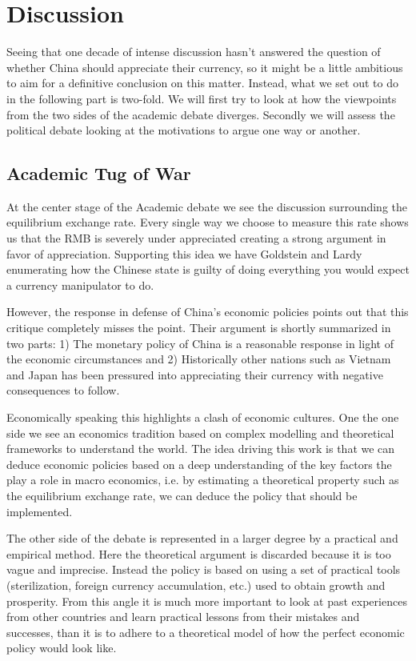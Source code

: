 \section{Discussion}
\label{sec:discussion}


Seeing that one decade of intense discussion hasn't answered the 
question of whether China should appreciate their currency, so it might 
be a little ambitious to aim for a definitive conclusion on this matter.  
Instead, what we set out to do in the following part is two-fold. We 
will first try to look at how the viewpoints from the two sides of the 
academic debate diverges. Secondly we will assess the political debate 
looking at the motivations to argue one way or another.

\subsection{Academic Tug of War}

At the center stage of the Academic debate we see the discussion 
surrounding the equilibrium exchange rate. Every single way we choose to 
measure this rate shows us that the RMB is severely under appreciated 
creating a strong argument in favor of appreciation. Supporting this 
idea we have Goldstein and Lardy enumerating how the Chinese state is 
guilty of doing everything you would expect a currency manipulator to 
do.

However, the response in defense of China's economic policies points out 
that this critique completely misses the point. Their argument is 
shortly summarized in two parts: 1) The monetary policy of China is a 
reasonable response in light of the economic circumstances and 2) 
Historically other nations such as Vietnam and Japan has been pressured 
into appreciating their currency with negative consequences to follow.

Economically speaking this highlights a clash of economic cultures. One 
the one side we see an economics tradition based on complex modelling 
and theoretical frameworks to understand the world. The idea driving 
this work is that we can deduce economic policies based on a deep 
understanding of the key factors the play a role in macro economics, 
i.e. by estimating a theoretical property such as the equilibrium 
exchange rate, we can deduce the policy that should be implemented.  

The other side of the debate is represented in a larger degree by a 
practical and empirical method. Here the theoretical argument is 
discarded because it is too vague and imprecise. Instead the policy is 
based on using a set of practical tools (sterilization, foreign currency 
accumulation, etc.) used to obtain growth and prosperity. From this 
angle it is much more important to look at past experiences from other 
countries and learn practical lessons from their mistakes and successes, 
than it is to adhere to a theoretical model of how the perfect economic 
policy would look like.


